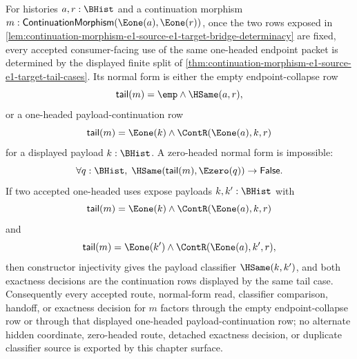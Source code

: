 \begin{corollary}
\label{cor:continuation-morphism-e1-source-e1-target-consumer-determinacy}
For histories $a,r:\BHist$ and a continuation morphism
$m:\mathsf{ContinuationMorphism}(\Eone(a),\Eone(r))$, once the two rows
exposed in \autoref{lem:continuation-morphism-e1-source-e1-target-bridge-determinacy}
are fixed, every accepted consumer-facing use of the same one-headed endpoint
packet is determined by the displayed finite split of
\autoref{thm:continuation-morphism-e1-source-e1-target-tail-cases}. Its normal
form is either the empty endpoint-collapse row
$$
\mathsf{tail}(m)=\emp\land\HSame(a,r),
$$
or a one-headed payload-continuation row
$$
\mathsf{tail}(m)=\Eone(k)\land\ContR(\Eone(a),k,r)
$$
for a displayed payload $k:\BHist$. A zero-headed normal form is impossible:
$$
\forall q:\BHist,\;
\HSame(\mathsf{tail}(m),\Ezero(q))\to\mathsf{False}.
$$
If two accepted one-headed uses expose payloads $k,k':\BHist$ with
$$
\mathsf{tail}(m)=\Eone(k)\land\ContR(\Eone(a),k,r)
$$
and
$$
\mathsf{tail}(m)=\Eone(k')\land\ContR(\Eone(a),k',r),
$$
then constructor injectivity gives the payload classifier $\HSame(k,k')$, and
both exactness decisions are the continuation rows displayed by the same tail
case. Consequently every accepted route, normal-form read, classifier
comparison, handoff, or exactness decision for $m$ factors through the empty
endpoint-collapse row or through that displayed one-headed
payload-continuation row; no alternate hidden coordinate, zero-headed route,
detached exactness decision, or duplicate classifier source is exported by this
chapter surface.
\end{corollary}
